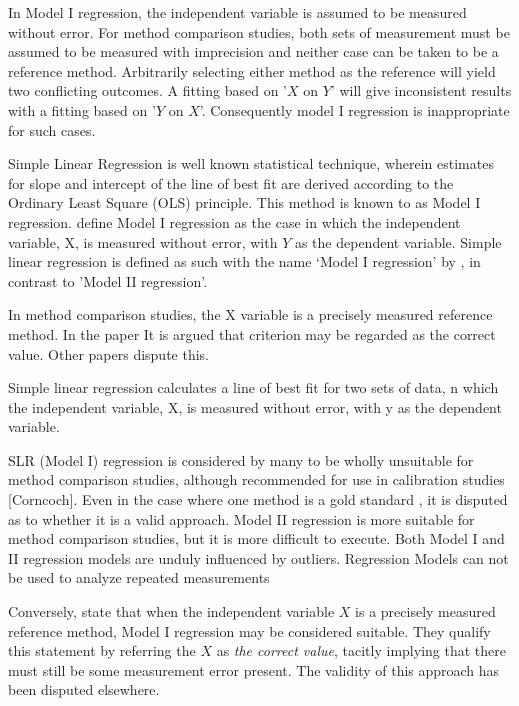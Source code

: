 \documentclass[12pt, a4paper]{report}
\theoremstyle{plain}
\theoremstyle{definition}
\theoremstyle{remark}
\begin{document}
	
	In Model I regression, the independent variable is assumed to be
	measured without error. For method comparison studies, both sets of measurement must be assumed to be measured with imprecision and neither case can be taken to be a reference method. Arbitrarily
	selecting either method as the reference will yield two conflicting outcomes. A fitting based on '$X$ on $Y$' will give inconsistent results with a fitting based on '$Y$ on $X$'. Consequently model I regression is inappropriate for such cases.
	
	Simple Linear Regression is well known statistical technique, wherein estimates for slope and
	intercept of the line of best fit are derived according to the Ordinary Least Square (OLS) principle. This method is known to \citet{CornCoch} as Model I regression. \citet{CornCoch} define Model I regression as the case in which the independent variable, X, is measured without error, with $Y$ as the dependent
	variable. Simple linear regression is defined as such with the name `Model I regression' by \citet{CornCoch}, in contrast to 'Model II regression'.
	
	In method comparison studies, the X variable is a precisely measured reference method. In the \citet{CornCoch} paper It is argued that criterion may be regarded as the correct value. Other papers dispute this.
	
	
	
	
	
	Simple linear regression calculates a line of best fit for two
	sets of data, n which the independent variable, X, is measured without error, with y as the dependent variable.  
	
	SLR (Model I) regression is considered by many \citet{BA83,CornCoch,ludbrook97} to be wholly unsuitable for
	method comparison studies, although recommended for use in calibration studies [Corncoch]. Even in the case where one
	method is a gold standard , it is disputed as to whether it is a valid approach. Model II regression is more suitable for method comparison studies, but it is more difficult to execute. Both Model I and II regression models are unduly influenced by outliers. Regression Models can not be used to analyze repeated measurements
	
	
	Conversely, \citet{CornCoch} state that when the independent
	variable $X$ is a precisely measured reference method, Model I
	regression may be considered suitable. They qualify this statement
	by referring the $X$ as \emph{the correct value}, tacitly
	implying that there must still be some measurement error present.
	The validity of this approach has been disputed elsewhere.
	
\end{document}

